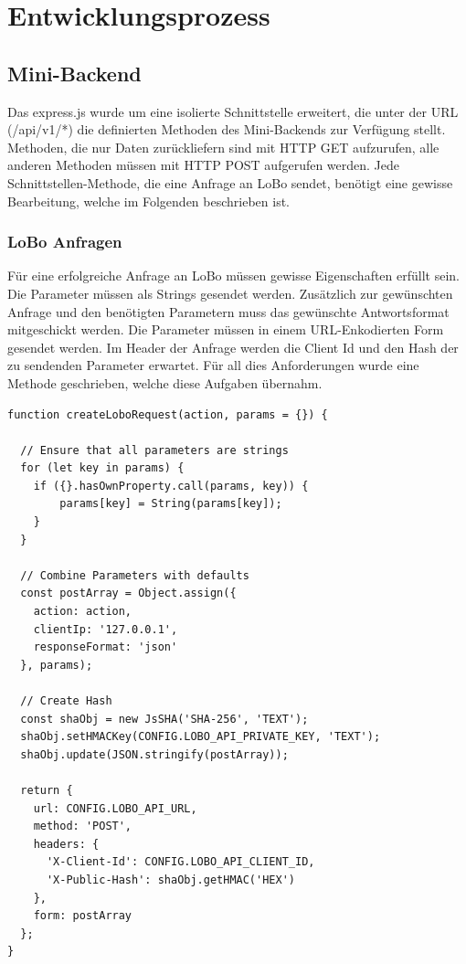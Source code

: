 \section{Entwicklungsprozess}
\subsection{Mini-Backend}
Das express.js wurde um eine isolierte Schnittstelle erweitert, die unter der URL (/api/v1/*) die definierten Methoden des Mini-Backends zur Verfügung stellt. Methoden, die nur Daten zurückliefern sind mit HTTP GET aufzurufen, alle anderen Methoden müssen mit HTTP POST aufgerufen werden. Jede Schnittstellen-Methode, die eine Anfrage an LoBo sendet, benötigt eine gewisse Bearbeitung, welche im Folgenden beschrieben ist.

\subsubsection{LoBo Anfragen}
Für eine erfolgreiche Anfrage an LoBo müssen gewisse Eigenschaften erfüllt sein. Die Parameter müssen als Strings gesendet werden. Zusätzlich zur gewünschten Anfrage und den benötigten Parametern muss das gewünschte Antwortsformat mitgeschickt werden. Die Parameter müssen in einem URL-Enkodierten Form gesendet werden. Im Header der Anfrage werden die Client Id und den Hash der zu sendenden Parameter erwartet. Für all dies Anforderungen wurde eine Methode geschrieben, welche diese Aufgaben übernahm.

\begin{lstlisting}[caption=Methode für LoBo Anfragen]
function createLoboRequest(action, params = {}) {

  // Ensure that all parameters are strings
  for (let key in params) {
    if ({}.hasOwnProperty.call(params, key)) {
        params[key] = String(params[key]);
    }
  }

  // Combine Parameters with defaults
  const postArray = Object.assign({
    action: action,
    clientIp: '127.0.0.1',
    responseFormat: 'json'
  }, params);

  // Create Hash
  const shaObj = new JsSHA('SHA-256', 'TEXT');
  shaObj.setHMACKey(CONFIG.LOBO_API_PRIVATE_KEY, 'TEXT');
  shaObj.update(JSON.stringify(postArray));

  return {
    url: CONFIG.LOBO_API_URL,
    method: 'POST',
    headers: {
      'X-Client-Id': CONFIG.LOBO_API_CLIENT_ID,
      'X-Public-Hash': shaObj.getHMAC('HEX')
    },
    form: postArray
  };
}
\end{lstlisting}

